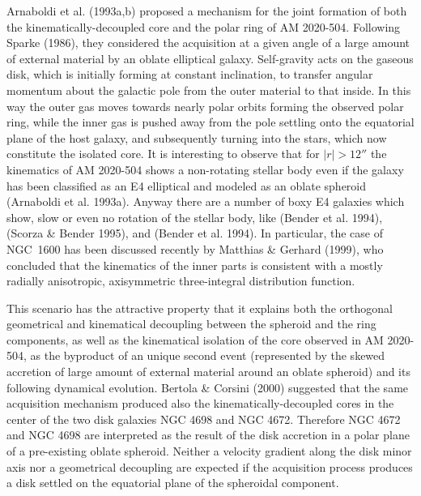 \documentclass[twocolumns]{aa}
\begin{document}
Arnaboldi et al. (1993a,b) proposed a mechanism for the joint
formation of both the kine\-ma\-tically-decoupled core and the polar
ring of AM 2020-504.  Following Sparke (1986), they considered the
acquisition at a given angle of a large amo\-unt of external material
by an oblate elliptical galaxy.  Self-gravity acts on the gaseous
disk, which is initially forming at constant inclination, to transfer
angular momentum about the galactic pole from the outer material to
that inside.  In this way the outer gas moves towards nearly polar
orbits forming the observed polar ring, while the inner gas is pushed
away from the pole settling onto the equatorial plane of the host
galaxy, and subsequently turning into the stars, which now constitute
the isolated core.  It is interesting to observe that for $|r|>12''$
the kinematics of AM 2020-504 shows a non-rotating stellar body even
if the galaxy has been classified as an E4 elliptical and modeled as
an oblate spheroid (Arnaboldi et al.  1993a).  Anyway there are
a number of boxy E4 galaxies which show, slow or even no
rotation of the stellar body, like  (Bender et al.
1994),  (Scorza \& Bender 1995), and 
 (Bender et al. 1994). In particular, 
the case of NGC~1600 has been discussed recently by Matthias \&
Gerhard (1999), who concluded that the kinematics of the inner
parts is consistent with a mostly radially anisotropic, axisymmetric
three-integral distribution function.

This scenario has the attractive property that it explains both the
orthogonal geometrical and kinematical decoupling between the
sphe\-roid and the ring components, as well as the kinematical
isolation of the core observed in AM 2020-504, as the byproduct of an
unique second event (represented by the ske\-wed accretion of large
amount of external material around an oblate spheroid) and its
following dynamical evolution.  Ber\-tola \& Corsini (2000) suggested
that the same acquisition me\-chanism produced also the
kine\-ma\-ti\-cal\-ly-decoupled cores in the center of the two disk
galaxies NGC 4698 and NGC 4672.  Therefore NGC 4672 and NGC 4698 are
interpreted as the result of the disk accretion in a polar plane of a
pre-existing oblate spheroid. Neither a velocity gradient along the disk
minor axis nor a geometrical decoupling are expected if the
acquisition process produces a disk settled on the equatorial plane of
the spheroidal component.
\end{document}
